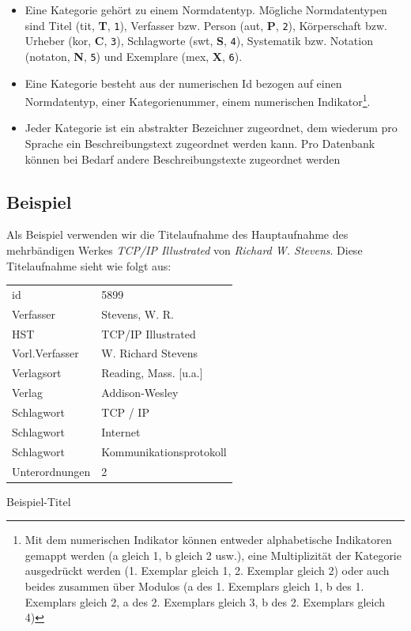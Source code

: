 \documentclass[11pt, twoside, a4paper, BCOR8mm, DIV12, bibtotoc,idxtotoc]{scrbook}
\begin{document}
\begin{itemize}
\item Eine Kategorie gehört zu einem Normdatentyp. Mögliche
  Normdatentypen sind Titel (tit, \textbf{T}, \texttt{1}), Verfasser
  bzw. Person (aut, \textbf{P}, \texttt{2}), Körperschaft bzw. Urheber
  (kor, \textbf{C}, \texttt{3}), Schlagworte (swt, \textbf{S},
  \texttt{4}), Systematik bzw. Notation (notaton, \textbf{N},
  \texttt{5}) und Exemplare (mex, \textbf{X}, \texttt{6}).
\item Eine Kategorie besteht aus der numerischen Id bezogen auf einen
  Normdatentyp, einer Kategorienummer, einem numerischen
  Indikator\footnote{Mit dem numerischen Indikator können entweder
    alphabetische Indikatoren gemappt werden (a gleich 1, b gleich 2
    usw.), eine Multiplizität der Kategorie ausgedrückt werden (1.
    Exemplar gleich 1, 2. Exemplar gleich 2) oder auch beides zusammen
    über Modulos (a des 1. Exemplars gleich 1, b des 1. Exemplars
    gleich 2, a des 2. Exemplars gleich 3, b des 2. Exemplars gleich
    4)}.
\item Jeder Kategorie ist ein abstrakter Bezeichner zugeordnet, dem
  wiederum pro Sprache ein Beschreibungstext zugeordnet werden
  kann. Pro Datenbank können bei Bedarf andere Beschreibungstexte
  zugeordnet werden
\end{itemize}


\subsection{Beispiel}

Als Beispiel verwenden wir die Titelaufnahme des Hauptaufnahme des
mehrbändigen Werkes \emph{TCP/IP Illustrated} von \emph{Richard
  W. Stevens}. Diese Titelaufnahme sieht wie folgt aus:

\begin{shadowenv}
\vspace{0.5cm}
\begin{center}
  \begin{tabular}{ll}
id	        & 5899\\
Verfasser	& Stevens, W. R.\\
HST	        & TCP/IP Illustrated\\
Vorl.Verfasser	& W. Richard Stevens\\
Verlagsort	& Reading, Mass. [u.a.]\\
Verlag	        & Addison-Wesley\\
Schlagwort	& TCP / IP\\
Schlagwort	& Internet\\
Schlagwort	& Kommunikationsprotokoll\\
Unterordnungen	& 2\\
  \end{tabular}
\end{center}
  \caption{Beispiel-Titel}
\vspace{0.5cm}
\end{shadowenv}
\end{document}
